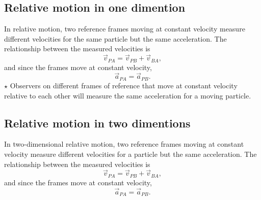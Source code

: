 \documentclass[fleqn]{article}
\begin{document}
\subsection{Relative motion in one dimention}
In relative motion, two reference frames moving at constant velocity measure different velocities for the same particle but the same acceleration. The relationship between the measured velocities is
\[
\vec{v}_{PA} = \vec{v}_{PB} + \vec{v}_{BA},
\]
and since the frames move at constant velocity,
\[
\vec{a}_{PA} = \vec{a}_{PB}.
\]
$\star$ Observers on different frames of reference that move at constant velocity relative to each other will measure the same acceleration for a moving particle.

\subsection{Relative motion in two dimentions}
In two-dimensional relative motion, two reference frames moving at constant velocity measure different velocities for a particle but the same acceleration. The relationship between the measured velocities is
\[
\vec{v}_{PA} = \vec{v}_{PB} + \vec{v}_{BA},
\]
and since the frames move at constant velocity,
\[
\vec{a}_{PA} = \vec{a}_{PB}.
\]
\end{document}
